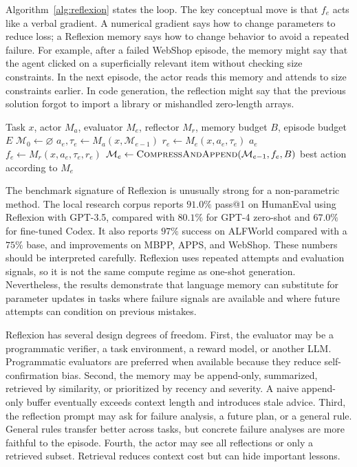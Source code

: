 Algorithm~\ref{alg:reflexion} states the loop. The key conceptual move is that $f_e$ acts like a verbal gradient. A numerical gradient says how to change parameters to reduce loss; a Reflexion memory says how to change behavior to avoid a repeated failure. For example, after a failed WebShop episode, the memory might say that the agent clicked on a superficially relevant item without checking size constraints. In the next episode, the actor reads this memory and attends to size constraints earlier. In code generation, the reflection might say that the previous solution forgot to import a library or mishandled zero-length arrays.

\begin{algorithm}[t]
\caption{Reflexion with language memory}
\label{alg:reflexion}
\begin{algorithmic}[1]
\Require Task $x$, actor $M_a$, evaluator $M_e$, reflector $M_r$, memory budget $B$, episode budget $E$
\State $\mathcal{M}_0 \gets \varnothing$
    \State $a_e,\tau_e \gets M_a(x,\mathcal{M}_{e-1})$
    \State $r_e \gets M_e(x,a_e,\tau_e)$
        \State \Return $a_e$
    \Else
        \State $f_e \gets M_r(x,a_e,\tau_e,r_e)$
        \State $\mathcal{M}_e \gets \textsc{CompressAndAppend}(\mathcal{M}_{e-1}, f_e, B)$
    \EndIf
\EndFor
\State \Return best action according to $M_e$
\end{algorithmic}
\end{algorithm}

The benchmark signature of Reflexion is unusually strong for a non-parametric method. The local research corpus reports $91.0\%$ pass@1 on HumanEval \cite{humaneval2021} using Reflexion with GPT-3.5, compared with $80.1\%$ for GPT-4 zero-shot and $67.0\%$ for fine-tuned Codex. It also reports $97\%$ success on ALFWorld compared with a $75\%$ base, and improvements on MBPP, APPS, and WebShop. These numbers should be interpreted carefully. Reflexion uses repeated attempts and evaluation signals, so it is not the same compute regime as one-shot generation. Nevertheless, the results demonstrate that language memory can substitute for parameter updates in tasks where failure signals are available and where future attempts can condition on previous mistakes.

Reflexion has several design degrees of freedom. First, the evaluator may be a programmatic verifier, a task environment, a reward model, or another LLM. Programmatic evaluators are preferred when available because they reduce self-confirmation bias. Second, the memory may be append-only, summarized, retrieved by similarity, or prioritized by recency and severity. A naive append-only buffer eventually exceeds context length and introduces stale advice. Third, the reflection prompt may ask for failure analysis, a future plan, or a general rule. General rules transfer better across tasks, but concrete failure analyses are more faithful to the episode. Fourth, the actor may see all reflections or only a retrieved subset. Retrieval reduces context cost but can hide important lessons.

